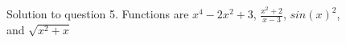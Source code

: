 \documentclass[answers,addpoints]{exam}
\begin{document}
\begin{questions}
\begin{figure}[ht!]
        \caption{Solution to question 5. Functions are $x^4-2x^2+3$,
        $\frac{x^2+2}{x-3}$, $sin(x)^2$, and $\sqrt{x^2 + x}$ }

    \end{figure}

\end{questions}
\end{document}
